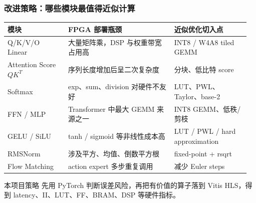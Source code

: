 \documentclass[10pt, aspectratio=169]{beamer}
\begin{document}
\begin{frame}
  \frametitle{改进策略：哪些模块最值得近似计算}
  \footnotesize
  \begin{table}
    \renewcommand{\arraystretch}{1.25}
    \setlength{\tabcolsep}{3pt}
    \begin{tabular}{@{}p{0.24\linewidth}p{0.42\linewidth}p{0.3\linewidth}@{}}
      \toprule
      模块                     & FPGA 部署瓶颈                 & 近似优化切入点                        \\
      \midrule
      Q/K/V/O Linear         & 大量矩阵乘，DSP 与权重带宽占用高        & INT8 / W4A8 tiled GEMM         \\
      Attention Score $QK^T$ & 序列长度增加后呈二次复杂度             & 分块、低比特 score                   \\
      Softmax                & exp、sum、division 对硬件不友好   & LUT、PWL、Taylor、base-2          \\
      FFN / MLP              & Transformer 中最大 GEMM 来源之一 & INT8 GEMM、低秩/剪枝                \\
      GELU / SiLU            & tanh / sigmoid 等非线性成本高    & LUT / PWL / hard approximation \\
      RMSNorm                & 涉及平方、均值、倒数平方根             & fixed-point + rsqrt            \\
      Flow Matching          & action expert 多步重复调用      & 减少 Euler steps                 \\
      \bottomrule
    \end{tabular}
  \end{table}

  \vspace{3pt}
  \begin{alertblock}{本项目策略}
    先用 PyTorch 判断误差风险，再把有价值的算子落到 Vitis HLS，得到 latency、II、LUT、FF、BRAM、DSP 等硬件指标。
  \end{alertblock}
\end{frame}
\end{document}

